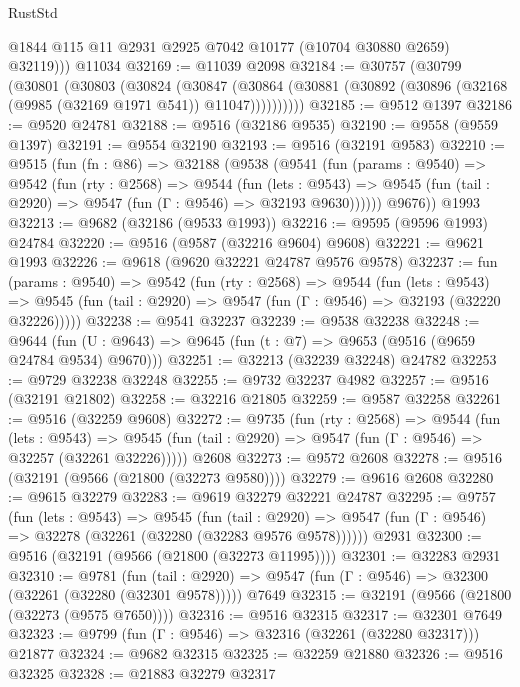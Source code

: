 \begin{lexlean}{RustStd}
\begin{coremodule}
          @1844
          @115
          @11
          @2931
          @2925
          @7042
          @10177
          (@10704 @30880 @2659)
          @32119)))
    @11034
@32169 := @11039 @2098
@32184 := @30757
    (@30799
      (@30801
        (@30803
          (@30824
            (@30847
              (@30864 (@30881 (@30892 (@30896 (@32168 (@9985 (@32169 @1971 @541)) @11047))))))))))
@32185 := @9512 @1397
@32186 := @9520 @24781
@32188 := @9516 (@32186 @9535)
@32190 := @9558 (@9559 @1397)
@32191 := @9554 @32190
@32193 := @9516 (@32191 @9583)
@32210 := @9515
    (fun (fn : @86) =>
    @32188
      (@9538
        (@9541
          (fun (params : @9540) =>
          @9542
            (fun (rty : @2568) =>
            @9544
              (fun (lets : @9543) =>
              @9545 (fun (tail : @2920) => @9547 (fun (Γ : @9546) => @32193 @9630))))))
        @9676))
    @1993
@32213 := @9682 (@32186 (@9533 @1993))
@32216 := @9595 (@9596 @1993) @24784
@32220 := @9516 (@9587 (@32216 @9604) @9608)
@32221 := @9621 @1993
@32226 := @9618 (@9620 @32221 @24787 @9576 @9578)
@32237 := fun (params : @9540) =>
  @9542
    (fun (rty : @2568) =>
    @9544
      (fun (lets : @9543) =>
      @9545 (fun (tail : @2920) => @9547 (fun (Γ : @9546) => @32193 (@32220 @32226)))))
@32238 := @9541 @32237
@32239 := @9538 @32238
@32248 := @9644
    (fun (U : @9643) => @9645 (fun (t : @7) => @9653 (@9516 (@9659 @24784 @9534) @9670)))
@32251 := @32213 (@32239 @32248) @24782
@32253 := @9729 @32238 @32248
@32255 := @9732 @32237 @4982
@32257 := @9516 (@32191 @21802)
@32258 := @32216 @21805
@32259 := @9587 @32258
@32261 := @9516 (@32259 @9608)
@32272 := @9735
    (fun (rty : @2568) =>
    @9544
      (fun (lets : @9543) =>
      @9545 (fun (tail : @2920) => @9547 (fun (Γ : @9546) => @32257 (@32261 @32226)))))
    @2608
@32273 := @9572 @2608
@32278 := @9516 (@32191 (@9566 (@21800 (@32273 @9580))))
@32279 := @9616 @2608
@32280 := @9615 @32279
@32283 := @9619 @32279 @32221 @24787
@32295 := @9757
    (fun (lets : @9543) =>
    @9545
      (fun (tail : @2920) =>
      @9547 (fun (Γ : @9546) => @32278 (@32261 (@32280 (@32283 @9576 @9578))))))
    @2931
@32300 := @9516 (@32191 (@9566 (@21800 (@32273 @11995))))
@32301 := @32283 @2931
@32310 := @9781
    (fun (tail : @2920) => @9547 (fun (Γ : @9546) => @32300 (@32261 (@32280 (@32301 @9578)))))
    @7649
@32315 := @32191 (@9566 (@21800 (@32273 (@9575 @7650))))
@32316 := @9516 @32315
@32317 := @32301 @7649
@32323 := @9799 (fun (Γ : @9546) => @32316 (@32261 (@32280 @32317))) @21877
@32324 := @9682 @32315
@32325 := @32259 @21880
@32326 := @9516 @32325
@32328 := @21883 @32279 @32317

\end{coremodule}
\end{lexlean}
